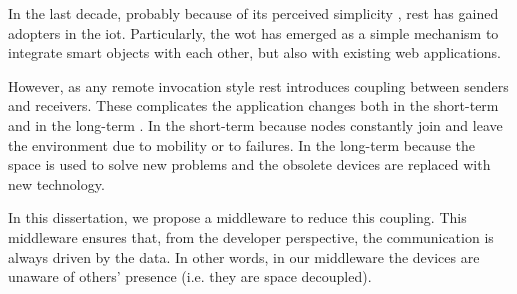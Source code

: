 In the last decade, probably because of its perceived simplicity \citep{guinard_search_2011}, \ac{rest} has gained adopters in the \ac{iot}.
Particularly, the \ac{wot} has emerged as a simple mechanism to integrate smart objects with each other, but also with existing web applications.

However, as any remote invocation style \ac{rest} introduces coupling between senders and receivers.
These complicates the application changes both in the short-term and in the long-term \citep{johanson_extending_2004}.
In the short-term because nodes constantly join and leave the environment due to mobility or to failures.
In the long-term because the space is used to solve new problems and the obsolete devices are replaced with new technology.

In this dissertation, we propose a middleware to reduce this coupling.
This middleware ensures that, from the developer perspective, the communication is always driven by the data.
In other words, in our middleware the devices are unaware of others' presence (i.e. they are \ac{space decoupled}).